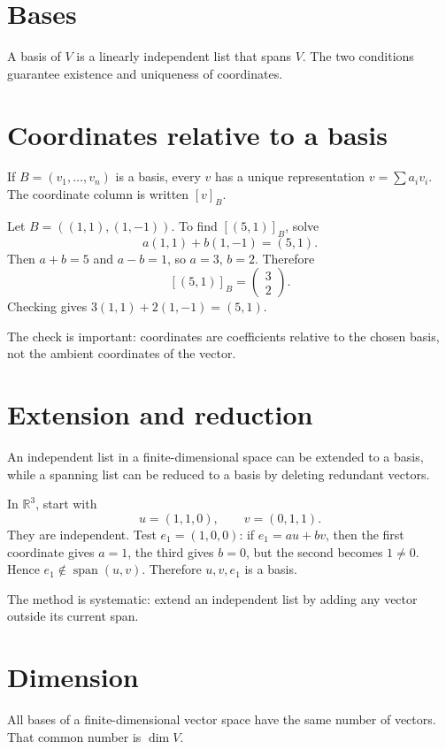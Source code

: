 \section{Bases}
A basis of $V$ is a linearly independent list that spans $V$. The two conditions guarantee existence and uniqueness of coordinates.

\section{Coordinates relative to a basis}
If $B=(v_1,\ldots,v_n)$ is a basis, every $v$ has a unique representation $v=\sum a_i v_i$. The coordinate column is written $[v]_B$.


\begin{example}\label{ex:i03-expand-01}
Let \(B=((1,1),(1,-1))\). To find \([(5,1)]_B\), solve
\[
a(1,1)+b(1,-1)=(5,1).
\]
Then \(a+b=5\) and \(a-b=1\), so \(a=3\), \(b=2\). Therefore
\[
[(5,1)]_B=\begin{pmatrix}3\\2\end{pmatrix}.
\]
Checking gives \(3(1,1)+2(1,-1)=(5,1)\).

The check is important: coordinates are coefficients relative to the chosen
basis, not the ambient coordinates of the vector.
\end{example}
\section{Extension and reduction}
An independent list in a finite-dimensional space can be extended to a basis, while a spanning list can be reduced to a basis by deleting redundant vectors.


\begin{example}\label{ex:i03-expand-02}
In \(\mathbb R^3\), start with
\[
u=(1,1,0),\qquad v=(0,1,1).
\]
They are independent. Test \(e_1=(1,0,0)\): if
\(e_1=au+bv\), then the first coordinate gives \(a=1\), the third gives
\(b=0\), but the second becomes \(1\neq0\). Hence \(e_1\notin\operatorname{span}(u,v)\).
Therefore \(u,v,e_1\) is a basis.

The method is systematic: extend an independent list by adding any vector
outside its current span.
\end{example}
\section{Dimension}
All bases of a finite-dimensional vector space have the same number of vectors. That common number is $\dim V$.

